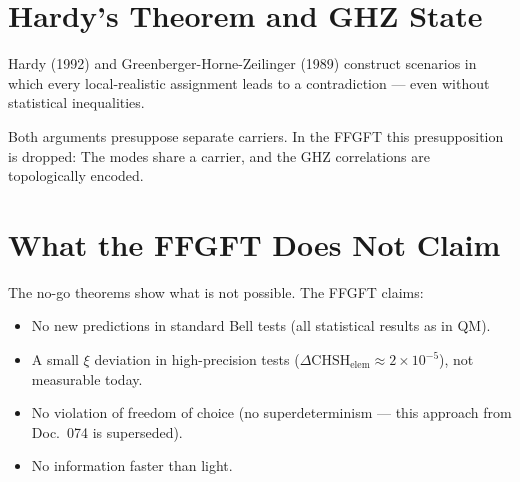 \section{Hardy's Theorem and GHZ State}

Hardy (1992) and Greenberger-Horne-Zeilinger (1989) construct
scenarios in which every local-realistic assignment leads to a contradiction — even without statistical inequalities.

Both arguments presuppose separate carriers. In the FFGFT
this presupposition is dropped: The modes share a carrier, and
the GHZ correlations are topologically encoded.

\section{What the FFGFT Does Not Claim}

The no-go theorems show what is not possible. The FFGFT claims:
\begin{itemize}
  \item No new predictions in standard Bell tests (all
        statistical results as in QM).
  \item A small $\xi$ deviation in high-precision tests
        ($\Delta\mathrm{CHSH}_{\mathrm{elem}}\approx2\times10^{-5}$),
        not measurable today.
  \item No violation of freedom of choice (no superdeterminism
        — this approach from Doc.~074 is superseded).
  \item No information faster than light.
\end{itemize}

